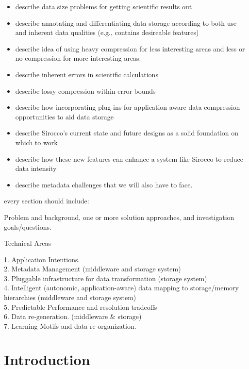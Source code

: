 

\begin{itemize}

\item describe data size problems for getting scientific results out
\item describe annotating and differentiating data storage according to both
  use and inherent data qualities (e.g., contains desireable features)
\item describe idea of using heavy compression for less interesting areas
  and less or no compression for more interesting areas.
\item describe inherent errors in scientific calculations
\item describe lossy compression within error bounds
\item describe how incorporating plug-ins for application aware data
  compression opportunities to aid data storage
\item describe Sirocco's current state and future designs as a solid
  foundation on which to work
\item describe how these new features can enhance a system like Sirocco to
  reduce data intensity
\item describe metadata challenges that we will also have to face.

\end{itemize}

every section should include:

Problem and background, one or more solution approaches, and investigation
goals/questions.

Technical Areas
 
1. Application Intentions.\\
2. Metadata Management (middleware and storage system)\\
3. Pluggable infrastructure for data transformation (storage system)\\
4. Intelligent (autonomic, application-aware) data mapping to storage/memory hierarchies (middleware and storage system)\\
5. Predictable Performance and resolution tradeoffs\\
6. Data re-generation. (middleware \& storage)\\
7. Learning Motifs and data re-organization.\\

\section*{Introduction}

